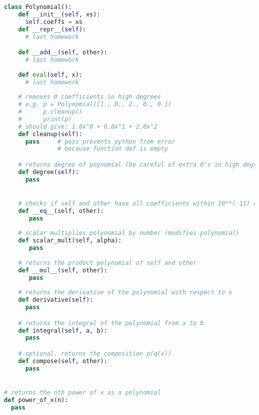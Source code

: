 \documentclass[letterpaper,11pt]{amsart}
\theoremstyle{plain}
\theoremstyle{definition}
\begin{document}
\begin{lstlisting}[language=Python]
class Polynomial():
    def __init__(self, xs):
      self.coeffs = xs
    def __repr__(self):
      # last homework 

    def __add__(self, other):
      # last homework 
    
    def eval(self, x):
      # last homework 
    
    # removes 0 coefficients in high degrees
    # e.g. p = Polynomial([1., 0., 2., 0., 0.])
    #      p.cleanup()
    #      print(p)
    # should give: 1.0x^0 + 0.0x^1 + 2.0x^2
    def cleanup(self):
      pass     # pass prevents python from error 
               # because function def is empty

    # returns degree of poynomial (be careful of extra 0's in high degrees)
    def degree(self):
      pass


    # checks if self and other have all coefficients within 10**(-11) of each other 
    def __eq__(self, other):
       pass 
   
    # scalar multiplies polynomial by number (modifies polynomial)
    def scalar_mult(self, alpha):
       pass 
   
    # returns the product polynomial of self and other
    def __mul__(self, other):
       pass 
   
    # returns the derivative of the polynomial with respect to x
    def derivative(self):
      pass

    # returns the integral of the polynomial from a to b 
    def integral(self, a, b):
      pass     

    # optional. returns the composition p(q(x))
    def compose(self, other):
      pass


# returns the nth power of x as a polynomial
def power_of_x(n):
  pass 
\end{lstlisting}
\end{document}
